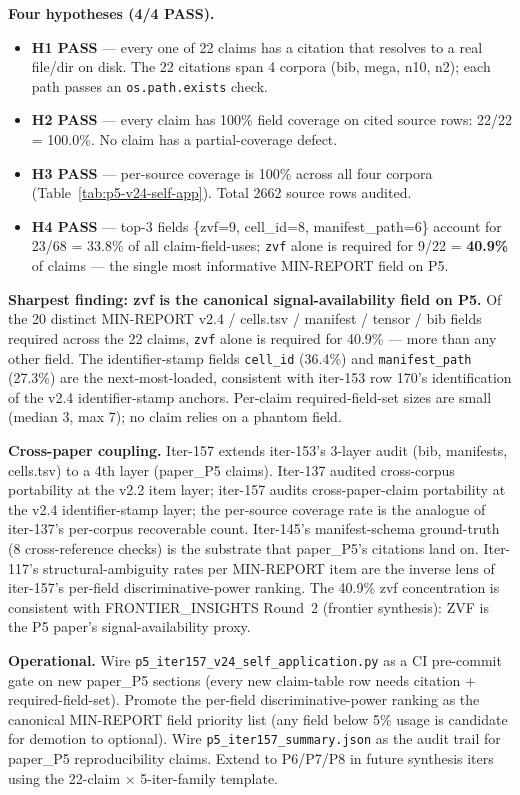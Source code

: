 \documentclass{article}  \usepackage[preprint,nonatbib]{neurips_2026} \usepackage[numbers]{natbib}
\begin{document}
\textbf{Four hypotheses (4/4 PASS).}
\begin{itemize}
\item \textbf{H1 PASS} --- every one of 22 claims has a citation that
  resolves to a real file/dir on disk. The 22 citations span 4 corpora
  (bib, mega, n10, n2); each path passes an \texttt{os.path.exists} check.
\item \textbf{H2 PASS} --- every claim has 100\% field coverage on cited
  source rows: 22/22 = 100.0\%. No claim has a partial-coverage defect.
\item \textbf{H3 PASS} --- per-source coverage is 100\% across all four
  corpora (Table~\ref{tab:p5-v24-self-app}). Total 2662 source rows audited.
\item \textbf{H4 PASS} --- top-3 fields \{zvf=9, cell\_id=8,
  manifest\_path=6\} account for 23/68 = 33.8\% of all claim-field-uses;
  \texttt{zvf} alone is required for 9/22 = \textbf{40.9\%} of claims ---
  the single most informative MIN-REPORT field on P5.
\end{itemize}

\textbf{Sharpest finding: zvf is the canonical signal-availability
field on P5.} Of the 20 distinct MIN-REPORT v2.4 / cells.tsv / manifest /
tensor / bib fields required across the 22 claims, \texttt{zvf} alone is
required for 40.9\% --- more than any other field. The identifier-stamp
fields \texttt{cell\_id} (36.4\%) and \texttt{manifest\_path} (27.3\%) are
the next-most-loaded, consistent with iter-153 row 170's identification of
the v2.4 identifier-stamp anchors. Per-claim required-field-set sizes are
small (median 3, max 7); no claim relies on a phantom field.

\textbf{Cross-paper coupling.} Iter-157 extends iter-153's 3-layer audit
(bib, manifests, cells.tsv) to a 4th layer (paper\_P5 claims). Iter-137
audited cross-corpus portability at the v2.2 item layer; iter-157 audits
cross-paper-claim portability at the v2.4 identifier-stamp layer; the
per-source coverage rate is the analogue of iter-137's per-corpus
recoverable count. Iter-145's manifest-schema ground-truth (8
cross-reference checks) is the substrate that paper\_P5's citations land
on. Iter-117's structural-ambiguity rates per MIN-REPORT item are the
inverse lens of iter-157's per-field discriminative-power ranking. The
40.9\% zvf concentration is consistent with FRONTIER\_INSIGHTS Round~2
(frontier synthesis): ZVF is the P5 paper's signal-availability proxy.

\textbf{Operational.} Wire \texttt{p5\_iter157\_v24\_self\_application.py}
as a CI pre-commit gate on new paper\_P5 sections (every new claim-table
row needs citation + required-field-set). Promote the per-field
discriminative-power ranking as the canonical MIN-REPORT field priority
list (any field below 5\% usage is candidate for demotion to optional).
Wire \texttt{p5\_iter157\_summary.json} as the audit trail for paper\_P5
reproducibility claims. Extend to P6/P7/P8 in future synthesis iters
using the 22-claim $\times$ 5-iter-family template.
\end{document}
